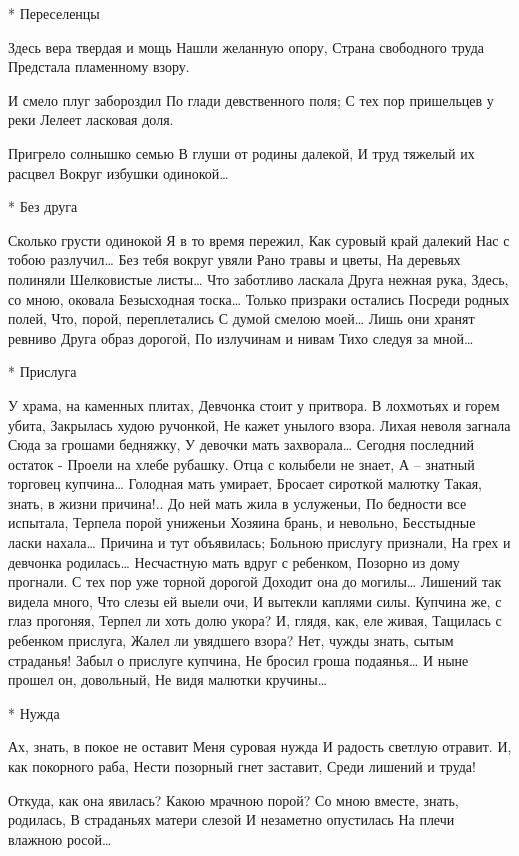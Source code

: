 * Переселенцы

Здесь вера твердая и мощь
Нашли желанную опору,
Страна свободного труда
Предстала пламенному взору.

И смело плуг забороздил
По глади девственного поля;
С тех пор пришельцев у реки
Лелеет ласковая доля.

Пригрело солнышко семью
В глуши от родины далекой,
И труд тяжелый их расцвел
Вокруг избушки одинокой…



* Без друга

Сколько грусти одинокой
Я в то время пережил,
Как суровый край далекий
Нас с тобою разлучил…
Без тебя вокруг увяли
Рано травы и цветы,
На деревьях полиняли
Шелковистые листы…
Что заботливо ласкала
Друга нежная рука,
Здесь, со мною, оковала
Безысходная тоска…
Только призраки остались
Посреди родных полей,
Что, порой, переплетались
С думой смелою моей…
Лишь они хранят ревниво
Друга образ дорогой,
По излучинам и нивам
Тихо следуя за мной…


* Прислуга

У храма, на каменных плитах,
Девчонка стоит у притвора.
В лохмотьях и горем убита,
Закрылась худою ручонкой,
Не кажет унылого взора.
Лихая неволя загнала
Сюда за грошами бедняжку,
У девочки мать захворала…
Сегодня последний остаток -
Проели на хлебе рубашку.
Отца с колыбели не знает,
А – знатный торговец купчина…
Голодная мать умирает,
Бросает сироткой малютку
Такая, знать, в жизни причина!..
До ней мать жила в услуженьи,
По бедности все испытала,
Терпела порой униженьи
Хозяина брань, и невольно,
Бесстыдные ласки нахала…
Причина и тут объявилась;
Больною прислугу признали,
На грех и девчонка родилась…
Несчастную мать вдруг с ребенком,
Позорно из дому прогнали.
С тех пор уже торной дорогой
Доходит она до могилы…
Лишений так видела много,
Что слезы ей выели очи,
И вытекли каплями силы.
Купчина же, с глаз прогоняя,
Терпел ли хоть долю укора?
И, глядя, как, еле живая,
Тащилась с ребенком прислуга,
Жалел ли увядшего взора?
Нет, чужды знать, сытым страданья!
Забыл о прислуге купчина,
Не бросил гроша подаянья…
И ныне прошел он, довольный,
Не видя малютки кручины…


* Нужда

Ах, знать, в покое не оставит
Меня суровая нужда
И радость светлую отравит.
И, как покорного раба,
Нести позорный гнет заставит,
Среди лишений и труда!

Откуда, как она явилась?
Какою мрачною порой?
Со мною вместе, знать, родилась,
В страданьях матери слезой
И незаметно опустилась
На плечи влажною росой…

